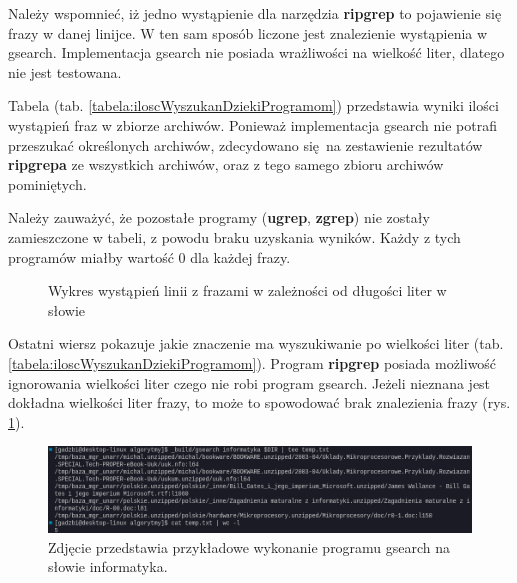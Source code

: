 Należy wspomnieć, iż jedno wystąpienie dla narzędzia \textbf{ripgrep} to pojawienie się frazy
w danej linijce. W ten sam sposób liczone jest znalezienie wystąpienia w gsearch.
Implementacja gsearch nie posiada wrażliwości na wielkość liter, dlatego nie 
jest testowana.

Tabela (tab. \ref{tabela:iloscWyszukanDziekiProgramom}) przedstawia wyniki ilości 
wystąpień fraz w zbiorze archiwów. Ponieważ implementacja gsearch nie potrafi
przeszukać określonych archiwów, zdecydowano się na zestawienie rezultatów
\textbf{ripgrepa} ze wszystkich archiwów, oraz z tego samego zbioru archiwów pominiętych. 

Należy zauważyć, że pozostałe programy (\textbf{ugrep}, \textbf{zgrep}) nie 
zostały zamieszczone w tabeli, z powodu braku uzyskania wyników.
Każdy z tych programów miałby wartość 0 dla każdej frazy.

\begin{figure}[htbp]
    \centering
    \caption{Wykres wystąpień linii z frazami w zależności od długości liter w słowie }
    \label{fig:wykresPorównaniaIlosciWystapień}
\end{figure}

Ostatni wiersz pokazuje jakie znaczenie ma wyszukiwanie po wielkości liter 
(tab. \ref{tabela:iloscWyszukanDziekiProgramom}). Program \textbf{ripgrep} posiada 
możliwość ignorowania wielkości liter czego nie robi program gsearch. Jeżeli
nieznana jest dokładna wielkości liter frazy, to może to spowodować brak 
znalezienia frazy (rys. \ref{fig:wykresPorównaniaIlosciWystapień}). 

\begin{figure}[htbp]
    \centering
    \includegraphics[width=\textwidth]{./images/gsearch-result-informatyka.png}
    \caption{Zdjęcie przedstawia przykładowe wykonanie programu gsearch na słowie informatyka.}
    \label{fig:wykonanieProgramuGsearch}
\end{figure}

